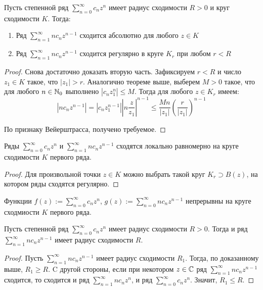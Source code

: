 \begin{proposition}
	Пусть степенной ряд $\sum_{n=0}^\infty c_nz^n$ имеет радиус сходимости $R > 0$ и круг сходимости $K$. Тогда:
	\begin{enumerate}
		\item Ряд $\sum_{n = 1}^\infty nc_nz^{n-1}$ сходится абсолютно для любого $z \in K$
		\item Ряд $\sum_{n = 1}^\infty nc_nz^{n-1}$ сходится регулярно в круге $K_r$ при любом $r < R$
	\end{enumerate}
\end{proposition}

\begin{proof}
	Снова достаточно доказать вторую часть. Зафиксируем $r < R$ и число $z_1 \in K$ такое, что $|z_1| > r$. Аналогично теореме выше, выберем $M > 0$ такое, что для любого $n \in \mathbb{N}_0$ выполнено $|c_nz_1^n| \le M$. Тогда для любого $z \in K_r$ имеем:
	\[|nc_nz^{n-1}| = |c_nz_1^{n-1}|\left|n\frac{z}{z_1}\right|^{n-1} \le \frac{Mn}{|z_1|}\left(\frac{r}{|z_1|}\right)^{n-1}\]
	
	По признаку Вейерштрасса, получено требуемое.
\end{proof}

\begin{corollary}
	Ряды $\sum_{n=0}^\infty c_nz^n$ и $\sum_{n = 1}^\infty nc_nz^{n-1}$ сходятся локально равномерно на круге сходимости $K$ первого ряда.
\end{corollary}

\begin{proof}
	Для произвольной точки $z \in K$ можно выбрать такой круг $K_r \supset B(z)$, на котором ряды сходятся регулярно.
\end{proof}

\begin{corollary}
	Функции $f(z) := \sum_{n = 0}^\infty c_nz^n$, $g(z) := \sum_{n = 0}^\infty nc_nz^{n-1}$ непрерывны на круге сходмиости $K$ первого ряда.
\end{corollary}

\begin{corollary}
	Пусть степенной ряд $\sum_{n=0}^\infty c_nz^n$ имеет радиус сходимости $R > 0$. Тогда и ряд $\sum_{n = 1}^\infty nc_nz^{n-1}$ имеет радиус сходимости $R$.
\end{corollary}

\begin{proof}
	Пусть $\sum_{n = 1}^\infty nc_nz^{n-1}$ имеет радиус сходимости $R_1$. Тогда, по доказанному выше, $R_1 \ge R$. C другой стороны, если при некотором $z \in \mathbb{C}$ ряд $\sum_{n = 1}^\infty nc_nz^{n-1}$ сходится, то сходится и ряд $\sum_{n = 1}^\infty nc_nz^n$, и ряд $\sum_{n = 0}^\infty c_nz^n$. Значит, $R_1 \le R$.
\end{proof}


